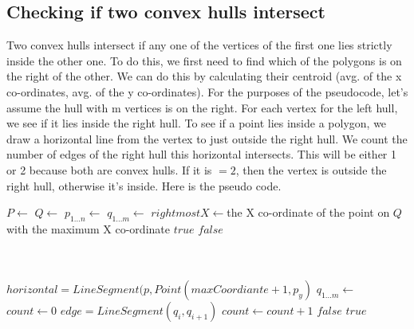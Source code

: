 \documentclass{article}
\begin{document}
\newpage
\subsection{Checking if two convex hulls intersect}

Two convex hulls intersect if any one of the vertices of the first one lies strictly inside the other one. To do this, we first need to find which of the polygons is on the right of the other. We can do this by calculating their centroid (avg. of the x co-ordinates, avg. of the y co-ordinates). For the purposes of the pseudocode, let's assume the hull with m vertices is on the right. For each vertex for the left hull, we see if it lies inside the right hull. To see if a point lies inside a polygon, we draw a horizontal line from the vertex to just outside the right hull. We count the number of edges of the right hull this horizontal intersects. This will be either 1 or 2 because both are convex hulls. If it is $ = 2$, then the vertex is outside the right hull, otherwise it's inside. Here is the pseudo code.
\newline
\begin{algorithmic}
	\State $P \gets  $ 
	\State $Q \gets  $ 
	\State $p_{1 \dots n} \gets  $ 
	\State $q_{1 \dots m} \gets  $ 
	\State $rightmostX \gets ${the X co-ordinate of the point on $Q$ with the maximum X co-ordinate}
			\State \Return $true$
		\EndIf
	\EndFor 
	\State \Return $false$  
\EndFunction
\end{algorithmic}
\begin{algorithmic}
	 \\
	 \\
	\State $horizontal = LineSegment(p, Point(maxCoordiante + 1, p_y)$
	\State $q_{1 \dots m} \gets  $ 
	\State $count \gets 0$
		\State $edge = LineSegment (q_i, q_{i+1})$ 
			\State $count \gets count+1$
		\EndIf
	\EndFor
		\State \Return $false$
	\Else
		\State \Return $true$
	\EndIf
\EndFunction
\end{algorithmic}
\end{document}
